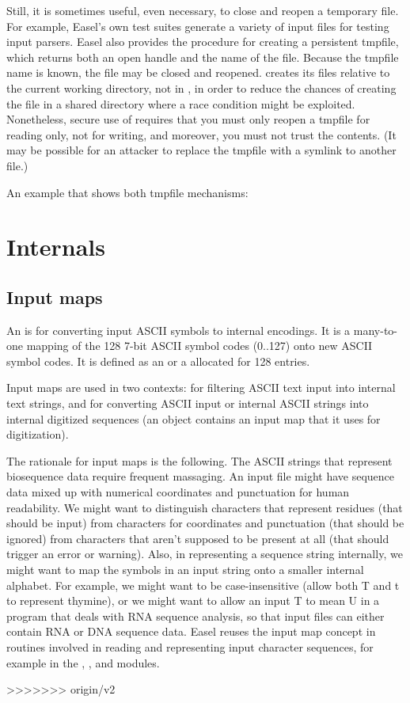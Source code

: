Still, it is sometimes useful, even necessary, to close and reopen a
temporary file. For example, Easel's own test suites generate a
variety of input files for testing input parsers.  Easel also provides
the  procedure for creating a persistent
tmpfile, which returns both an open  handle and the
name of the file. Because the tmpfile name is known, the file may be
closed and reopened.   creates its files
relative to the current working directory, not in , in
order to reduce the chances of creating the file in a shared directory
where a race condition might be exploited. Nonetheless, secure use of
 requires that you must only reopen a
tmpfile for reading only, not for writing, and moreover, you must not
trust the contents.  (It may be possible for an attacker to replace
the tmpfile with a symlink to another file.)

An example that shows both tmpfile mechanisms:



\section{Internals}

\subsection{Input maps}

An  is for converting input ASCII symbols to
internal encodings. It is a many-to-one mapping of the 128 7-bit ASCII
symbol codes (0..127) onto new ASCII symbol codes. It is defined as
an  or a 
allocated for 128 entries.

Input maps are used in two contexts: for filtering ASCII text input
into internal text strings, and for converting ASCII input or internal
ASCII strings into internal digitized sequences (an 
object contains an input map that it uses for digitization).

The rationale for input maps is the following. The ASCII strings that
represent biosequence data require frequent massaging. An input file
might have sequence data mixed up with numerical coordinates and
punctuation for human readability. We might want to distinguish
characters that represent residues (that should be input) from
characters for coordinates and punctuation (that should be ignored)
from characters that aren't supposed to be present at all (that should
trigger an error or warning). Also, in representing a sequence string
internally, we might want to map the symbols in an input string onto a
smaller internal alphabet. For example, we might want to be
case-insensitive (allow both T and t to represent thymine), or we
might want to allow an input T to mean U in a program that deals with
RNA sequence analysis, so that input files can either contain RNA or
DNA sequence data.  Easel reuses the input map concept in routines
involved in reading and representing input character sequences, for
example in the , , and 
modules.

>>>>>>> origin/v2
